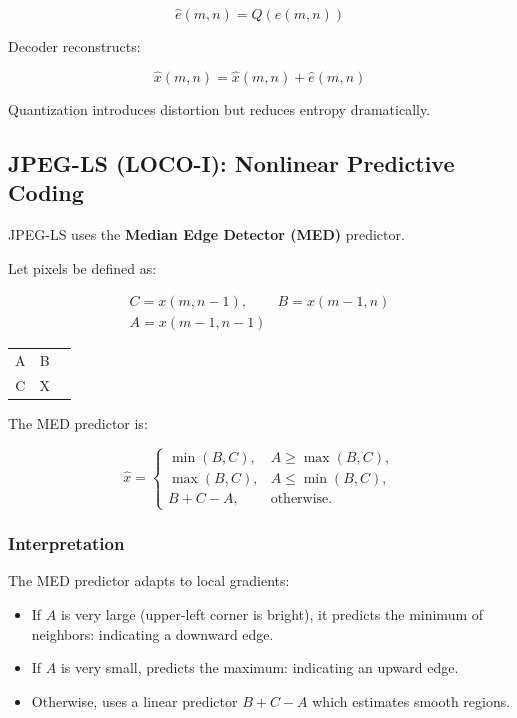 \documentclass{AnantDocumentation}
\begin{document}
\[
\hat{e}(m,n) = Q(e(m,n))
\]

Decoder reconstructs:

\[
\hat{x}(m,n) = \hat{x}(m,n)+\hat{e}(m,n)
\]

Quantization introduces distortion but reduces entropy dramatically.

\subsection{JPEG-LS (LOCO-I): Nonlinear Predictive Coding}

JPEG-LS uses the \textbf{Median Edge Detector (MED)} predictor.

Let pixels be defined as:

\[
\begin{array}{cc}
C = x(m,n-1), & B = x(m-1,n) \\
A = x(m-1,n-1) &
\end{array}
\]

\begin{center}
\begin{tabular}{ccc}
A & B \\
C & X
\end{tabular}
\end{center}

The MED predictor is:

\[
\hat{x} =
\begin{cases}
\min(B,C), & A \ge \max(B,C), \\
\max(B,C), & A \le \min(B,C), \\
B + C - A, & \text{otherwise}.
\end{cases}
\]

\subsubsection*{Interpretation}

The MED predictor adapts to local gradients:

\begin{itemize}
\item If $A$ is very large (upper-left corner is bright), it predicts the minimum of neighbors: indicating a downward edge.
\item If $A$ is very small, predicts the maximum: indicating an upward edge.
\item Otherwise, uses a linear predictor $B + C - A$ which estimates smooth regions.
\end{itemize}
\end{document}
